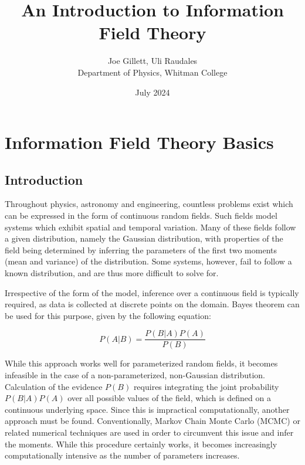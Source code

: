 \documentclass[letterpaper,12pt]{article}
\begin{document}
\setlength\parindent{0pt}
\setlength\belowdisplayskip{12pt}
\setlength\belowdisplayshortskip{12pt}

\title{An Introduction to Information Field Theory}
\author{Joe Gillett, Uli Raudales \\ Department of Physics, Whitman College}
\date{July 2024}

\maketitle
\section{Information Field Theory Basics}
\subsection{Introduction}
Throughout physics, astronomy and engineering, countless problems exist which can be expressed in the form of continuous random fields. Such fields model systems which exhibit spatial and temporal variation. Many of these fields follow a given distribution, namely the Gaussian distribution, with properties of the field being determined by inferring the parameters of the first two moments (mean and variance) of the distribution. Some systems, however, fail to follow a known distribution, and are thus more difficult to solve for. 
\hfill \break

Irrespective of the form of the model, inference over a continuous field is typically required, as data is collected at discrete points on the domain. Bayes theorem can be used for this purpose, given by the following equation:

\begin{equation}
    P(A|B) = \frac{P(B|A)P(A)}{P(B)}    
\end{equation}

While this approach works well for parameterized random fields, it becomes infeasible in the case of a non-parameterized, non-Gaussian distribution. Calculation of the evidence $P(B)$ requires integrating the joint probability $P(B|A)P(A)$ over all possible values of the field, which is defined on a continuous underlying space. Since this is impractical computationally, another approach must be found. Conventionally, Markov Chain Monte Carlo (MCMC) or related numerical techniques are used in order to circumvent this issue and infer the moments. While this procedure certainly works, it becomes increasingly computationally intensive as the number of parameters increases. 
\hfill \break
\end{document}

